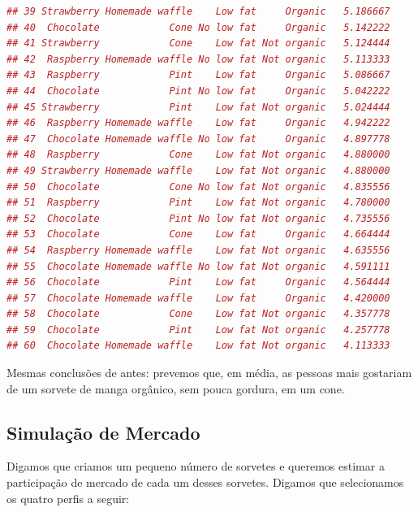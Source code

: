 \documentclass{article}
\begin{document}
\begin{lstlisting}[language=R]
## 39 Strawberry Homemade waffle    Low fat     Organic   5.186667
## 40  Chocolate            Cone No low fat     Organic   5.142222
## 41 Strawberry            Cone    Low fat Not organic   5.124444
## 42  Raspberry Homemade waffle No low fat Not organic   5.113333
## 43  Raspberry            Pint    Low fat     Organic   5.086667
## 44  Chocolate            Pint No low fat     Organic   5.042222
## 45 Strawberry            Pint    Low fat Not organic   5.024444
## 46  Raspberry Homemade waffle    Low fat     Organic   4.942222
## 47  Chocolate Homemade waffle No low fat     Organic   4.897778
## 48  Raspberry            Cone    Low fat Not organic   4.880000
## 49 Strawberry Homemade waffle    Low fat Not organic   4.880000
## 50  Chocolate            Cone No low fat Not organic   4.835556
## 51  Raspberry            Pint    Low fat Not organic   4.780000
## 52  Chocolate            Pint No low fat Not organic   4.735556
## 53  Chocolate            Cone    Low fat     Organic   4.664444
## 54  Raspberry Homemade waffle    Low fat Not organic   4.635556
## 55  Chocolate Homemade waffle No low fat Not organic   4.591111
## 56  Chocolate            Pint    Low fat     Organic   4.564444
## 57  Chocolate Homemade waffle    Low fat     Organic   4.420000
## 58  Chocolate            Cone    Low fat Not organic   4.357778
## 59  Chocolate            Pint    Low fat Not organic   4.257778
## 60  Chocolate Homemade waffle    Low fat Not organic   4.113333
\end{lstlisting}


Mesmas conclusões de antes: prevemos que, em média, as pessoas mais gostariam de um sorvete de manga orgânico, sem pouca gordura, em um cone.

\subsection{Simulação de Mercado}

Digamos que criamos um pequeno número de sorvetes e queremos estimar a participação de mercado de cada um desses sorvetes. Digamos que selecionamos os quatro perfis a seguir:
\end{document}
